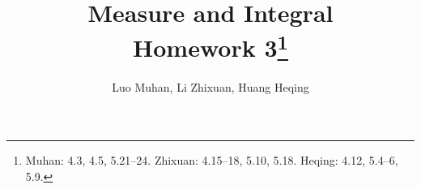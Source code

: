 \documentclass[11pt]{article}
\theoremstyle{definition}
\begin{document}
  \title{\textbf{Measure and Integral}\\ Homework 3\footnote{
    Muhan: 4.3, 4.5, 5.21--24.
    Zhixuan: 4.15--18, 5.10, 5.18.
    Heqing: 4.12, 5.4--6, 5.9. }}
  \author{Luo Muhan, Li Zhixuan, Huang Heqing}
  \maketitle

%
%  
%
%  

%  
%  
%  
  \setcounter{section}{5}
  
\end{document}

